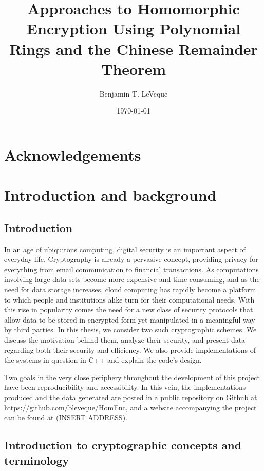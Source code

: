 \documentclass[11pt]{report}
\title{Approaches to Homomorphic Encryption Using Polynomial Rings and the Chinese Remainder Theorem}
\author{Benjamin T. LeVeque}
\date{\today}
\begin{document}
\maketitle


\tableofcontents

\newpage

\chapter{Acknowledgements}


\chapter{Introduction and background}

\section{Introduction}

In an age of ubiquitous computing, digital security is an important aspect of everyday life. Cryptography is already a pervasive concept, providing privacy for everything from email communication to financial transactions. As computations involving large data sets become more expensive and time-consuming, and as the need for data storage increases, cloud computing has rapidly become a platform to which people and institutions alike turn for their computational needs. With this rise in popularity comes the need for a new class of security protocols that allow data to be stored in encrypted form yet manipulated in a meaningful way by third parties. In this thesis, we consider two such cryptographic schemes. We discuss the motivation behind them, analyze their security, and present data regarding both their security and efficiency. We also provide implementations of the systems in question in C++ and explain the code's design.

Two goals in the very close periphery throughout the development of this project have been reproducibility and accessibility. In this vein, the implementations produced and the data generated are posted in a public repository on Github at https://github.com/bleveque/HomEnc, and a website accompanying the project can be found at (INSERT ADDRESS).

\section{Introduction to cryptographic concepts and terminology} 
\end{document}
